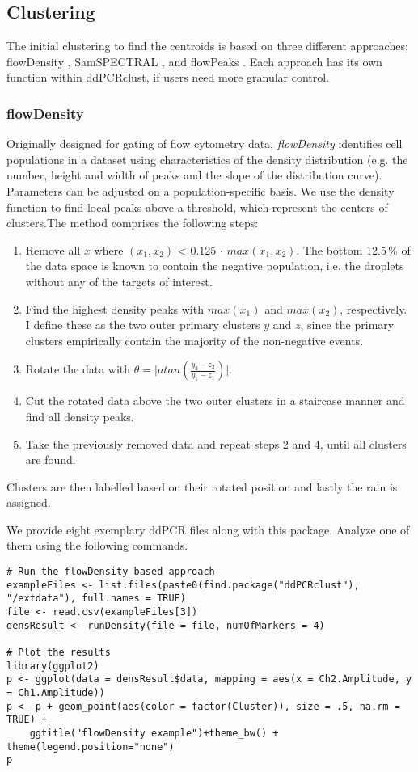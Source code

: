 \documentclass{article}
\begin{document}
\subsection{Clustering}
The initial clustering to find the centroids is based on three different approaches; flowDensity \cite{malek2015flowdensity}, SamSPECTRAL \cite{zare2010data}, and flowPeaks \cite{ge2012flowpeaks}. Each approach has its own function within ddPCRclust, if users need more granular control.

\subsubsection{flowDensity}
Originally designed for gating of flow cytometry data, \emph{flowDensity} identifies cell populations in a dataset using characteristics of the density distribution (e.g. the number, height and width of peaks and the slope of the distribution curve). Parameters can be adjusted on a population-specific basis. We use the density function to find local peaks above a threshold, which represent the centers of clusters.The method comprises the following steps:
\begin{enumerate}
\item Remove all $x$ where $(x_1,x_2)$ < 0.125$\,\cdot\,max(x_1,x_2)$. The bottom 12.5$\,\%$ of the data space is known to contain the negative population, i.e. the droplets without any of the targets of interest.
\item Find the highest density peaks with $max(x_1)$ and $max(x_2)$, respectively. I define these as the two outer primary clusters $y$ and $z$, since the primary clusters empirically contain the majority of the non-negative events. 
\item Rotate the data with $\theta = \lvert atan(\frac{y_2 - z_2}{y_1 - z_1}) \rvert$.
\item Cut the rotated data above the two outer clusters in a staircase manner and find all density peaks.
\item Take the previously removed data and repeat steps 2 and 4, until all clusters are found.
\end{enumerate}
Clusters are then labelled based on their rotated position and lastly the rain is assigned.

We provide eight exemplary ddPCR files along with this package. Analyze one of them using the following commands.
\begin{verbatim}
# Run the flowDensity based approach
exampleFiles <- list.files(paste0(find.package("ddPCRclust"), "/extdata"), full.names = TRUE)
file <- read.csv(exampleFiles[3])
densResult <- runDensity(file = file, numOfMarkers = 4)

# Plot the results
library(ggplot2)
p <- ggplot(data = densResult$data, mapping = aes(x = Ch2.Amplitude, y = Ch1.Amplitude))
p <- p + geom_point(aes(color = factor(Cluster)), size = .5, na.rm = TRUE) +
    ggtitle("flowDensity example")+theme_bw() + theme(legend.position="none")
p
\end{verbatim}
\end{document}
